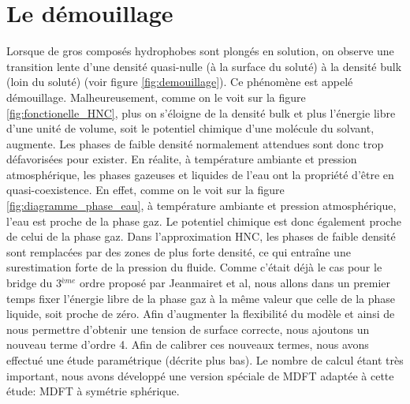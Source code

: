 \section{Le démouillage}
Lorsque de gros composés hydrophobes sont plongés en solution, on observe une transition lente d'une densité quasi-nulle (à la surface du soluté) à la densité bulk (loin du soluté) (voir figure \ref{fig:demouillage}). Ce phénomène est appelé démouillage. Malheureusement, comme on le voit sur la figure \ref{fig:fonctionelle_HNC}, plus on s'éloigne de la densité bulk et plus l'énergie libre d'une unité de volume, soit le potentiel chimique d'une molécule du solvant, augmente. Les phases de faible densité normalement attendues sont donc trop défavorisées pour exister. En réalite, à température ambiante et pression atmosphérique, les phases gazeuses et liquides de l'eau ont la propriété d'être en quasi-coexistence. En effet, comme on le voit sur la figure \ref{fig:diagramme_phase_eau}, à température ambiante et pression atmosphérique, l'eau est proche de la phase gaz. Le potentiel chimique est donc également proche de celui de la phase gaz. Dans l'approximation HNC, les phases de faible densité sont remplacées par des zones de plus forte densité, ce qui entraîne une surestimation forte de la pression du fluide. Comme c'était déjà le cas pour le bridge du 3$^{ème}$ ordre proposé par Jeanmairet et al\cite{jeanmairet_molecular_2013}, nous allons dans un premier temps fixer l'énergie libre de la phase gaz à la même valeur que celle de la phase liquide, soit proche de zéro. Afin d'augmenter la flexibilité du modèle et ainsi de nous permettre d'obtenir une tension de surface correcte, nous ajoutons un nouveau terme d'ordre 4. Afin de calibrer ces nouveaux termes, nous avons effectué une étude paramétrique (décrite plus bas). Le nombre de calcul étant très important, nous avons développé une version spéciale de MDFT adaptée à cette étude: MDFT à symétrie sphérique. 





